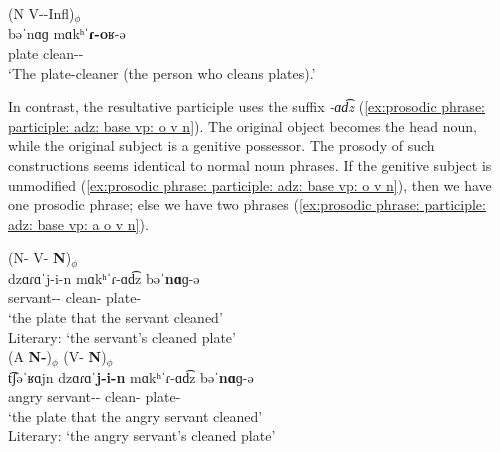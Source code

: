 \begin{exe}
	\ex  \glll (N V-{\sptcp}-Infl)$_\phi$
	\\
	{{bəˈ{nɑɡ}}} {mɑkʰˈ\textbf{ɾ-o}ʁ-ə}
	\\
	plate clean-{\sptcp}-{}
	\\
	\trans `The plate-cleaner  (the person who cleans plates).'   \label{example:inton:phrase:nounverb:oG:lone}
	\\ 
\end{exe}

In contrast, the resultative participle   uses the suffix \textit{-ɑd͡z} (\ref{ex:prosodic phrase: participle: adz: base vp: o v n}). The original object becomes the head noun, while the original subject is a genitive possessor. The prosody of such constructions seems identical to normal noun phrases. If the genitive subject is unmodified (\ref{ex:prosodic phrase: participle: adz: base vp: o v n}), then we have one prosodic phrase; else we have two phrases (\ref{ex:prosodic phrase: participle: adz: base vp: a o v n}). 

\begin{exe}
	\ex \begin{xlist}
		\ex \glll (N-{\gen} V-{\rptcp} \textbf{N})$_\phi$
		\\
		{{dzɑɾɑˈ{j-i-n}}}  {mɑkʰˈɾ-ɑd͡z} {{bəˈ\textbf{nɑ}ɡ-ə}}
		\\
		servant-{\gen}-{}  clean-{\rptcp} plate-{} 
		\\
		\trans `the plate that the servant cleaned' \\
		Literary:  `the servant's cleaned plate'  \label{ex:prosodic phrase: participle: adz: base vp: o v n} 
		\\ 
		\ex \glll (A \textbf{N-{\gen}})$_\phi$ (V-{\rptcp} \textbf{N})$_\phi$
		\\
		t͡ʃəˈʁɑjn  {{dzɑɾɑˈ\textbf{j-i-n}}}   {mɑkʰˈɾ-ɑd͡z} {{bəˈ\textbf{nɑ}ɡ-ə}}
		\\
		angry servant-{\gen}-{}  clean-{\rptcp} plate-{} 
		\\
		\trans `the plate that the angry servant cleaned' \\
		Literary:  `the angry servant's cleaned plate'  \label{ex:prosodic phrase: participle: adz: base vp: a o v n} 
		\\ 
	\end{xlist}
\end{exe}

